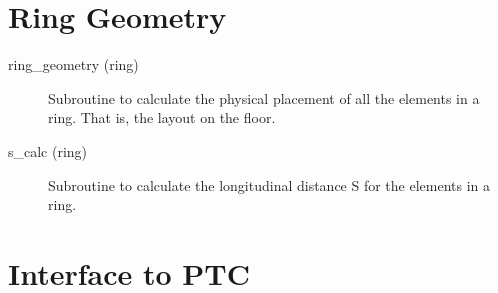 \section{Ring Geometry}
\label{r:geom}     

\begin{description}

\item[ring\_geometry (ring)] \Newline
Subroutine to calculate the physical placement of all the elements in a ring. 
That is, the layout on the floor. 

\item[s\_calc (ring)] \Newline
Subroutine to calculate the longitudinal distance S for the elements in a ring. 

\end{description}

\section{Interface to PTC}
\label{r:ptc}      

